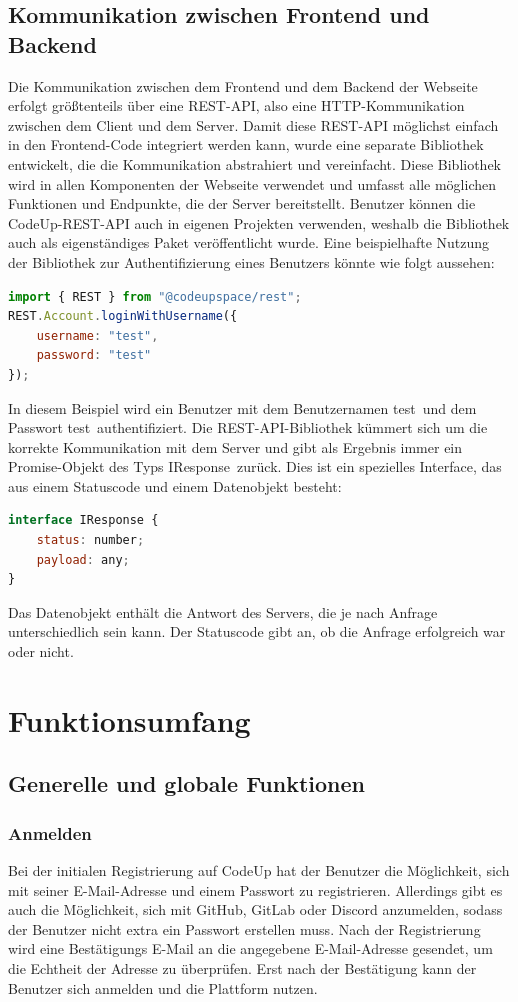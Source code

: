 \documentclass[main.tex]{subfiles}
\begin{document}
    \subsection{Kommunikation zwischen Frontend und Backend}\label{subsec:web_srv_communication}
    Die Kommunikation zwischen dem Frontend und dem Backend der Webseite erfolgt größtenteils über eine REST-API, also eine HTTP-Kommunikation zwischen dem Client und dem Server.
    Damit diese REST-API möglichst einfach in den Frontend-Code integriert werden kann, wurde eine separate Bibliothek entwickelt, die die Kommunikation abstrahiert und vereinfacht.
    Diese Bibliothek wird in allen Komponenten der Webseite verwendet und umfasst alle möglichen Funktionen und Endpunkte, die der Server bereitstellt.
    Benutzer können die CodeUp-REST-API auch in eigenen Projekten verwenden, weshalb die Bibliothek auch als eigenständiges Paket veröffentlicht wurde.
    Eine beispielhafte Nutzung der Bibliothek zur Authentifizierung eines Benutzers könnte wie folgt aussehen:
    \begin{lstlisting}[language=javascript]
import { REST } from "@codeupspace/rest";
REST.Account.loginWithUsername({
    username: "test",
    password: "test"
});
    \end{lstlisting}
    In diesem Beispiel wird ein Benutzer mit dem Benutzernamen \dq test\dq \ und dem Passwort \dq test\dq \ authentifiziert.
    Die REST-API-Bibliothek kümmert sich um die korrekte Kommunikation mit dem Server und gibt als Ergebnis immer ein Promise-Objekt des Typs \dq IResponse\dq\ zurück.
    Dies ist ein spezielles Interface, das aus einem Statuscode und einem Datenobjekt besteht:
    \begin{lstlisting}[language=javascript]
interface IResponse {
    status: number;
    payload: any;
}
    \end{lstlisting}
    Das Datenobjekt enthält die Antwort des Servers, die je nach Anfrage unterschiedlich sein kann.
    Der Statuscode gibt an, ob die Anfrage erfolgreich war oder nicht.

    \section{Funktionsumfang}
    \subsection{Generelle und globale Funktionen}
    \subsubsection{Anmelden}
    Bei der initialen Registrierung auf CodeUp hat der Benutzer die Möglichkeit, sich mit seiner E-Mail-Adresse und einem Passwort zu registrieren.
    Allerdings gibt es auch die Möglichkeit, sich mit GitHub, GitLab oder Discord anzumelden, sodass der Benutzer nicht extra ein Passwort erstellen muss.
    Nach der Registrierung wird eine Bestätigungs E-Mail an die angegebene E-Mail-Adresse gesendet, um die Echtheit der Adresse zu überprüfen.
    Erst nach der Bestätigung kann der Benutzer sich anmelden und die Plattform nutzen.
\end{document}
